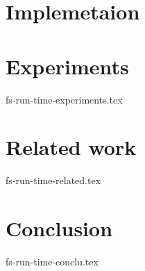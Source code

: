 \documentclass[sigconf]{style/acmart}
\begin{document}
\section {Implemetaion}


\section {Experiments}
 {fs-run-time-experiments.tex}

\section {Related work}
 {fs-run-time-related.tex}

\section {Conclusion}
 {fs-run-time-conclu.tex}



\end{document}
